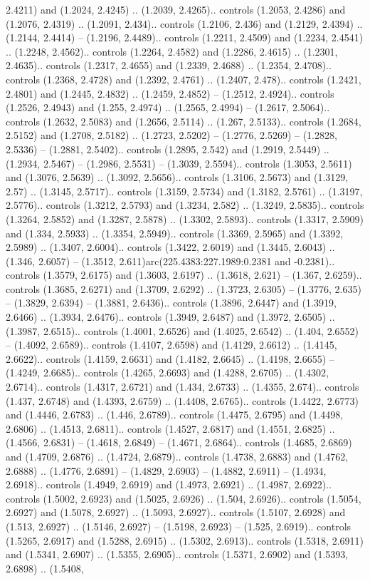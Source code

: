 2.4211) and (1.2024, 2.4245) .. (1.2039, 2.4265).. controls (1.2053, 2.4286) and (1.2076, 2.4319) .. (1.2091, 2.434).. controls (1.2106, 2.436) and (1.2129, 2.4394) .. (1.2144, 2.4414) -- (1.2196, 2.4489).. controls (1.2211, 2.4509) and (1.2234, 2.4541) .. (1.2248, 2.4562).. controls (1.2264, 2.4582) and (1.2286, 2.4615) .. (1.2301, 2.4635).. controls (1.2317, 2.4655) and (1.2339, 2.4688) .. (1.2354, 2.4708).. controls (1.2368, 2.4728) and (1.2392, 2.4761) .. (1.2407, 2.478).. controls (1.2421, 2.4801) and (1.2445, 2.4832) .. (1.2459, 2.4852) -- (1.2512, 2.4924).. controls (1.2526, 2.4943) and (1.255, 2.4974) .. (1.2565, 2.4994) -- (1.2617, 2.5064).. controls (1.2632, 2.5083) and (1.2656, 2.5114) .. (1.267, 2.5133).. controls (1.2684, 2.5152) and (1.2708, 2.5182) .. (1.2723, 2.5202) -- (1.2776, 2.5269) -- (1.2828, 2.5336) -- (1.2881, 2.5402).. controls (1.2895, 2.542) and (1.2919, 2.5449) .. (1.2934, 2.5467) -- (1.2986, 2.5531) -- (1.3039, 2.5594).. controls (1.3053, 2.5611) and (1.3076, 2.5639) .. (1.3092, 2.5656).. controls (1.3106, 2.5673) and (1.3129, 2.57) .. (1.3145, 2.5717).. controls (1.3159, 2.5734) and (1.3182, 2.5761) .. (1.3197, 2.5776).. controls (1.3212, 2.5793) and (1.3234, 2.582) .. (1.3249, 2.5835).. controls (1.3264, 2.5852) and (1.3287, 2.5878) .. (1.3302, 2.5893).. controls (1.3317, 2.5909) and (1.334, 2.5933) .. (1.3354, 2.5949).. controls (1.3369, 2.5965) and (1.3392, 2.5989) .. (1.3407, 2.6004).. controls (1.3422, 2.6019) and (1.3445, 2.6043) .. (1.346, 2.6057) -- (1.3512, 2.611)arc(225.4383:227.1989:0.2381 and -0.2381).. controls (1.3579, 2.6175) and (1.3603, 2.6197) .. (1.3618, 2.621) -- (1.367, 2.6259).. controls (1.3685, 2.6271) and (1.3709, 2.6292) .. (1.3723, 2.6305) -- (1.3776, 2.635) -- (1.3829, 2.6394) -- (1.3881, 2.6436).. controls (1.3896, 2.6447) and (1.3919, 2.6466) .. (1.3934, 2.6476).. controls (1.3949, 2.6487) and (1.3972, 2.6505) .. (1.3987, 2.6515).. controls (1.4001, 2.6526) and (1.4025, 2.6542) .. (1.404, 2.6552) -- (1.4092, 2.6589).. controls (1.4107, 2.6598) and (1.4129, 2.6612) .. (1.4145, 2.6622).. controls (1.4159, 2.6631) and (1.4182, 2.6645) .. (1.4198, 2.6655) -- (1.4249, 2.6685).. controls (1.4265, 2.6693) and (1.4288, 2.6705) .. (1.4302, 2.6714).. controls (1.4317, 2.6721) and (1.434, 2.6733) .. (1.4355, 2.674).. controls (1.437, 2.6748) and (1.4393, 2.6759) .. (1.4408, 2.6765).. controls (1.4422, 2.6773) and (1.4446, 2.6783) .. (1.446, 2.6789).. controls (1.4475, 2.6795) and (1.4498, 2.6806) .. (1.4513, 2.6811).. controls (1.4527, 2.6817) and (1.4551, 2.6825) .. (1.4566, 2.6831) -- (1.4618, 2.6849) -- (1.4671, 2.6864).. controls (1.4685, 2.6869) and (1.4709, 2.6876) .. (1.4724, 2.6879).. controls (1.4738, 2.6883) and (1.4762, 2.6888) .. (1.4776, 2.6891) -- (1.4829, 2.6903) -- (1.4882, 2.6911) -- (1.4934, 2.6918).. controls (1.4949, 2.6919) and (1.4973, 2.6921) .. (1.4987, 2.6922).. controls (1.5002, 2.6923) and (1.5025, 2.6926) .. (1.504, 2.6926).. controls (1.5054, 2.6927) and (1.5078, 2.6927) .. (1.5093, 2.6927).. controls (1.5107, 2.6928) and (1.513, 2.6927) .. (1.5146, 2.6927) -- (1.5198, 2.6923) -- (1.525, 2.6919).. controls (1.5265, 2.6917) and (1.5288, 2.6915) .. (1.5302, 2.6913).. controls (1.5318, 2.6911) and (1.5341, 2.6907) .. (1.5355, 2.6905).. controls (1.5371, 2.6902) and (1.5393, 2.6898) .. (1.5408, 